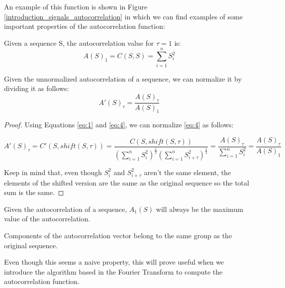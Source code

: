 An example of this function is shown in Figure
\ref{introduction_signals_autocorrelation} in which we can find examples of
some important properties of the autocorrelation function:

\begin{theorem}\label{theorem:1.2.1}
  Given a sequence S, the autocorrelation value for $\tau = 1$ is:
    \begin{equation}
      A(S)_{1}=C(S, S)=\sum_{i=1}^{n}S_{i}^2
    \end{equation}
\end{theorem}

\begin{corollary}
  Given the unnormalized autocorrelation of a sequence, we can
  normalize it by dividing it as follows:
  \begin{equation}
    A'(S)_{\tau} = \frac{A(S)_{\tau}}{A(S)_{1}}
  \end{equation}
\end{corollary}

\begin{proof}
  Using Equations \ref{eq:1} and \ref{eq:4}, we can normalize \ref{eq:4} as
  follows:

    $$A'(S)_{\tau} = C'(S, shift(S, \tau)) = \frac{C(S, shift(S, \tau))}{(\sum_{i=1}^{n} S_{i}^{2})^{\frac{1}{2}}(\sum_{i=1}^{n} S_{i+\tau}^{2})^\frac{1}{2}} = \frac{A(S)_{\tau}}{\sum_{i=1}^{n} S_{i}^{2}} = \frac{A(S)_{\tau}}{A(S)_{1}}$$

  Keep in mind that, even though $S_{i}^2$ and $S_{i+\tau}^2$ aren't the same element, the elements of the shifted version are the same as the original sequence so the total sum is the same.
\end{proof}

\begin{corollary}\label{autocorrelation:coro:1}
  Given the autocorrelation of a sequence, $A_{1}(S)$ will always be the maximum value of the autocorrelation.
\end{corollary}

\begin{property}
 Components of the autocorrelation vector belong to the same group as the
  original sequence.
\end{property}

Even though this seems a naive property, this will prove
useful when we introduce the algorithm based in the Fourier Transform to
compute the autocorrelation function.









